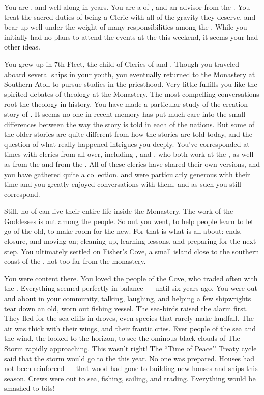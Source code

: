 \documentclass[char]{GL2020}
\begin{document}
\name{\cEbbPriest{}}

You are \cEbbPriest{\intro}, and well along in years. You are a \cEbbPriest{\cleric} of \cEbbFull{\intro}, and an advisor from the \pShip{}. You treat the sacred duties of being a Cleric with all of the gravity they deserve, and bear up well under the weight of many responsibilities among the \pShippies{}. While you initially had no plans to attend the events at the \pSchool{} this weekend, it seems your \cEbb{\Deity} had other ideas.

You grew up in 7th Fleet, the child of Clerics of \cEbb{\intro} and \cFlow{\intro}. Though you traveled aboard several ships in your youth, you eventually returned to the Monastery at Southern Atoll to pursue studies in the priesthood. Very little fulfills you like the spirited debates of theology at the Monastery. The most compelling conversations root the theology in history. You have made a particular study of the creation story of \pEarth{}. It seems no one in recent memory has put much care into the small differences between the way the story is told in each of the nations. But some of the older stories are quite different from how the stories are told today, and the question of what really happened intrigues you deeply. You've corresponded at times with clerics from all over, including \cBeetle{\intro}, and \cFlowPriest{\intro}, who both work at the \pSchool{}, as well as \cAntiChup{\intro} from the \pTech{} and \cHedonist{\intro} from the \pFarm{}. All of these clerics have shared their own versions, and you have gathered quite a collection. \cBeetle{} and \cFlowPriest{} were particularly generous with their time and you greatly enjoyed conversations with them, and as such you still correspond. 

Still, no \cEbbPriest{\cleric} of \cEbb{} can live their entire life inside the Monastery. The work of the Goddesses is out among the people. So out you went, to help people learn to let go of the old, to make room for the new. For that is what \cEbb{} is all about: ends, closure, and moving on; cleaning up, learning lessons, and preparing for the next step. You ultimately settled on Fisher’s Cove, a small island close to the southern coast of the \pFarm{}, not too far from the monastery.

You were content there. You loved the people of the Cove, who traded often with the \pFarmers{}. Everything seemed perfectly in balance — until six years ago. You were out and about in your community, talking, laughing, and helping a few shipwrights tear down an old, worn out fishing vessel. The sea-birds raised the alarm first. They fled for the sea cliffs in droves, even species that rarely make landfall. The air was thick with their wings, and their frantic cries. Ever people of the sea and the wind, the \pShip{} looked to the horizon, to see the ominous black clouds of The Storm rapidly approaching. This wasn’t right! The ``Time of Peace’’ Treaty cycle said that the storm would go to the \pTech{} this year. No one was prepared. Houses had not been reinforced — that wood had gone to building new houses and ships this season. Crews were out to sea, fishing, sailing, and trading. Everything would be smashed to bits!
\end{document}
